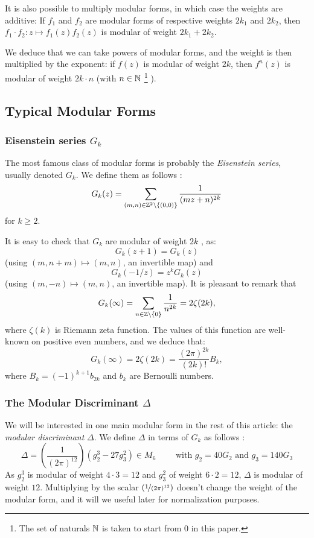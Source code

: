 It is also possible to multiply modular forms, in which case the weights are additive:
If $f_1$ and $f_2$ are modular forms of respective weights $2k_1$ and $2k_2$, then $f_1 \cdot f_2:z \mapsto f_1(z)f_2(z)$ is modular of weight $2k_1+2k_2$.

We deduce that we can take powers of modular forms, and the weight is then multiplied by the exponent:
if $f(z)$ is modular of weight $2k$, then $f^n(z)$ is modular of weight $2k \cdot n$ (with $n \in \mathbb{N}$ \footnote{The set of naturals $\mathbb{N}$ is taken to start from $0$ in this paper.} ).



\subsection{Typical Modular Forms}
\subsubsection{Eisenstein series $G_k$}
The most famous class of modular forms is probably the \textit{Eisenstein series}, usually denoted $G_k$. We define them as follows \cite[Examples of Modular Forms]{ModularFormsComputationalApproach}:
$$
G_k(z) = \sum_{(m,n) \in \mathbb{Z}^2\setminus\{(0,0)\}} \frac{1}{(mz+n)^{2k}}
$$
for $k \geq 2$.

It is easy to check that $G_k$ are modular of weight $2k$ \cite[Proposition 2.1]{ModularFormsComputationalApproach}, as:
$$
G_k(z+1) = G_k(z)
$$
(using $(m,n+m) \mapsto (m,n)$, an invertible map) and
$$
G_k(-1/z) = z^k G_k(z)
$$
(using $(m,-n) \mapsto (m,n)$, an invertible map).
It is pleasant to remark that \cite[Proposition 2.2]{ModularFormsComputationalApproach}
$$
G_k(\infty) = \sum_{n \in \mathbb{Z} \setminus \{0\} } \frac{1}{n^{2k}} = 2\zeta(2k),
$$ where $\zeta(k)$ is Riemann zeta function.
The values of this function are well-known on positive even numbers, and we deduce \cite[p.194]{MathHandbook} that:
$$
G_k(\infty) = 2\zeta(2k) = \frac{(2\pi)^{2k}}{(2k)!}B_k,
$$
where $B_k = (-1)^{k+1} b_{2k}$ and $b_k$ are Bernoulli numbers.

\subsubsection{The Modular Discriminant $\Delta$}
We will be interested in one main modular form in the rest of this article: the \textit{modular discriminant} $\Delta$.
We define $\Delta$ in terms of $G_k$ as follows \cite[p.84]{CourseInArithmetic}:
$$
\Delta = \left( \frac{1}{(2\pi)^{12}} \right) (g_2^3 - 27g_3^2) \in M_6 \qquad \text{ with } g_2 = 40G_2 \text{ and } g_3 = 140G_3
$$
As $g_2^3$ is modular of weight $4 \cdot 3=12$ and $g_3^2$ of weight $6 \cdot 2 = 12$, $\Delta$ is modular of weight $12$.
Multiplying by the scalar $\left( \nicefrac{1}{(2\pi)^{12}} \right)$ doesn't change the weight of the modular form, and it will we useful later for normalization purposes.

